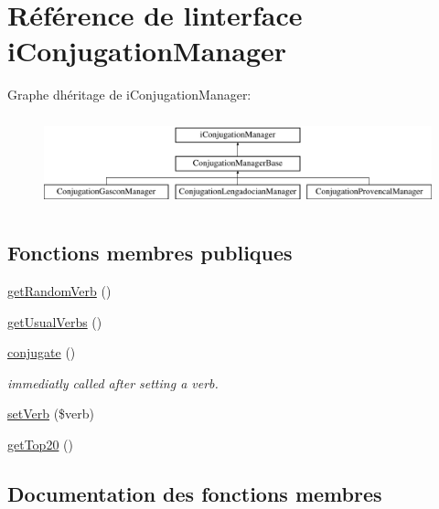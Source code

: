 \hypertarget{interfaceiConjugationManager}{}\section{Référence de l\textquotesingle{}interface i\+Conjugation\+Manager}
\label{interfaceiConjugationManager}
Graphe d\textquotesingle{}héritage de i\+Conjugation\+Manager\+:\begin{figure}[H]
\begin{center}
\leavevmode
\includegraphics[height=2.654028cm]{interfaceiConjugationManager}
\end{center}
\end{figure}
\subsection*{Fonctions membres publiques}
\begin{DoxyCompactItemize}
\item 
\hyperlink{interfaceiConjugationManager_a2e955e8c88d45869683005343cbfac60}{get\+Random\+Verb} ()
\item 
\hyperlink{interfaceiConjugationManager_a2a7ed39313c1c92ef5c01c88895de36e}{get\+Usual\+Verbs} ()
\item 
\hyperlink{interfaceiConjugationManager_afba24324d7c48d3ab00ffba63cbc1b9e}{conjugate} ()
\begin{DoxyCompactList}\small\item\em immediatly called after setting a verb. \end{DoxyCompactList}\item 
\hyperlink{interfaceiConjugationManager_a1b56822fc7f5f7b7b9c0b0c406993b3c}{set\+Verb} (\$verb)
\item 
\hyperlink{interfaceiConjugationManager_a0273fc00cbbf9e83823d571e3e2c8945}{get\+Top20} ()
\end{DoxyCompactItemize}


\subsection{Documentation des fonctions membres}
\hypertarget{interfaceiConjugationManager_afba24324d7c48d3ab00ffba63cbc1b9e}{}\label{interfaceiConjugationManager_afba24324d7c48d3ab00ffba63cbc1b9e} 

